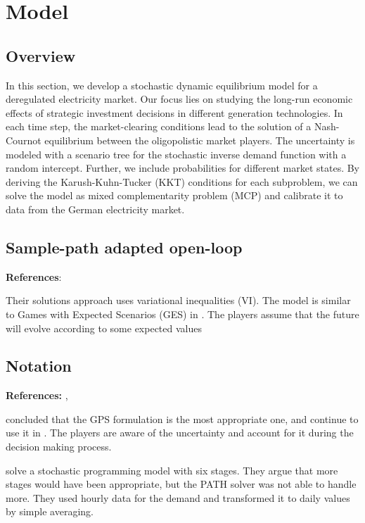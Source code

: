 \section{Model}

\subsection{Overview}

In this section, we develop a stochastic dynamic equilibrium model for a deregulated electricity market. Our focus lies on studying the long-run economic effects of strategic investment decisions in different generation technologies. In each time step, the market-clearing conditions lead to the solution of a Nash-Cournot equilibrium between the oligopolistic market players. The uncertainty is modeled with a scenario tree for the stochastic inverse demand function with a random intercept. Further, we include probabilities for different market states. By deriving the Karush-Kuhn-Tucker (KKT) conditions for each subproblem, we can solve the model as mixed complementarity problem (MCP) and calibrate it to data from the German electricity market.


\subsection{Sample-path adapted open-loop}
\label{sec:sample-path-adapted}

\textbf{References}: \cite{Pineau2003}

Their solutions approach uses variational inequalities (VI). The model is similar to Games with Expected Scenarios (GES) in \cite{Genc2007}. The players assume that the future will evolve according to some expected values

\subsection{Notation}

\textbf{References:} \cite{Genc2007}, \cite{Genc2008}

\cite{Genc2007} concluded that the GPS formulation is the most appropriate one, and continue to use it in \cite{Genc2008}.
The players are aware of the uncertainty and account for it during the decision making process.

\cite{Genc2008} solve a stochastic programming model with six stages. They argue that more stages would have been appropriate, but the PATH solver was not able to handle more. They used hourly data for the demand and transformed it to daily values by simple averaging.

